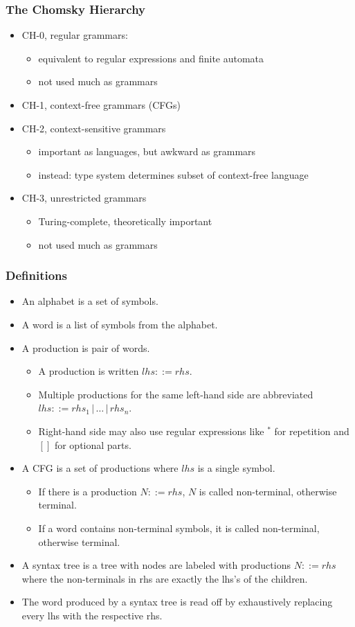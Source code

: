 \begin{frame}\frametitle{The Chomsky Hierarchy}
\begin{itemize}
\item CH-0, regular grammars: 
 \begin{itemize}
  \item equivalent to regular expressions and finite automata
  \item not used much as grammars
 \end{itemize}
\item CH-1, context-free grammars (CFGs) 
\item CH-2, context-sensitive grammars
 \begin{itemize}
   \item important as languages, but awkward as grammars
   \item instead: type system determines subset of context-free language
 \end{itemize}
\item CH-3, unrestricted grammars
 \begin{itemize}
   \item Turing-complete, theoretically important
   \item not used much as grammars
 \end{itemize}
\end{itemize}
\end{frame}

\begin{frame}\frametitle{Definitions}
\begin{itemize}
\item An alphabet is a set of symbols.
\item A word is a list of symbols from the alphabet.
\item A production is pair of words.
 \begin{itemize}
 \item A production is written $lhs::=rhs$.
 \item Multiple productions for the same left-hand side are abbreviated $lhs::=rhs_1 \,|\,\ldots\,|\, rhs_n$.
 \item Right-hand side may also use regular expressions like $^*$ for repetition and $[]$ for optional parts.
 \end{itemize}
\item A CFG is a set of productions where $lhs$ is a single symbol.
 \begin{itemize}
 \item If there is a production $N::=rhs$, $N$ is called non-terminal, otherwise terminal.
 \item If a word contains non-terminal symbols, it is called non-terminal, otherwise terminal.
 \end{itemize}
\item A syntax tree is a tree with nodes are labeled with productions $N::=rhs$ where the non-terminals in rhs are exactly the lhs's of the children.
\item The word produced by a syntax tree is read off by exhaustively replacing every lhs with the respective rhs.
\end{itemize}
\end{frame}

